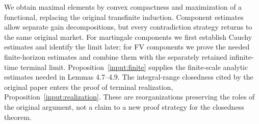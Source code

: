 We obtain maximal elements by convex compactness and maximization of a
functional, replacing the original transfinite induction. Component estimates
allow separate gain decompositions, but every contradiction strategy returns
to the same original market. For martingale components we first establish
Cauchy estimates and identify the limit later; for FV components we prove the
needed finite-horizon estimates and combine them with the separately retained
infinite-time terminal limit. Proposition~\ref{input:finite} supplies the finite-scale analytic estimates needed in Lemmas 4.7--4.9.
The integral-range closedness cited by the original paper enters the proof of terminal realization, Proposition~\ref{input:realization}. These are reorganizations
preserving the roles of the original argument, not a claim to a new proof
strategy for the closedness theorem.
